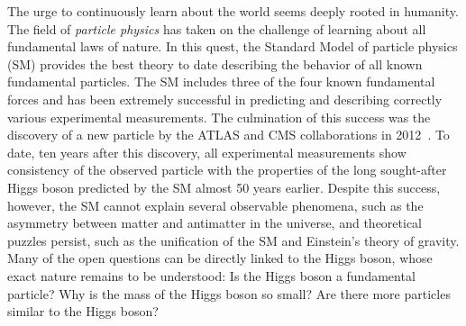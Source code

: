 
The urge to continuously learn about the world seems deeply rooted in humanity.
The field of \emph{particle physics} has taken on the challenge of learning about all fundamental laws of nature. 
In this quest, the Standard Model of particle physics (SM) provides the best theory to date describing the behavior of all known fundamental particles. 
The SM includes three of the four known fundamental forces and has been extremely successful in predicting and describing correctly various experimental measurements. 
The culmination of this success was the discovery of a new particle by the ATLAS and CMS collaborations in 2012~\cite{HIGG-2012-27,CMS-HIG-12-028}.
To date, ten years after this discovery, all experimental measurements show consistency of the observed particle with the properties of the long sought-after Higgs boson predicted by the SM almost 50 years earlier.
Despite this success, however, the SM cannot explain several observable phenomena, such as the asymmetry between matter and antimatter in the universe, and theoretical puzzles persist, such as the unification of the SM and Einstein's theory of gravity.
Many of the open questions can be directly linked to the Higgs boson, whose exact nature remains to be understood: Is the Higgs boson a fundamental particle? Why is the mass of the Higgs boson so small? Are there more particles similar to the Higgs boson?

